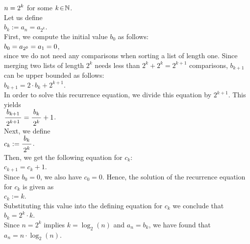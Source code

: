 \hspace*{1.3cm}
$\displaystyle n = 2^k$ \qquad for some $k \!\in\! \mathbb{N}$.
\\[0.2cm]
Let us define
\\[0.2cm]
\hspace*{1.3cm}
$b_k := a_n = a_{2^k}$.
\\[0.2cm]
First, we compute the initial value $b_0$ as follows:
\\[0.2cm]
\hspace*{1.3cm}
$\displaystyle b_0 = a_{2^0} = a_1 = 0$,
\\[0.2cm]
since we do not need any comparisons when sorting a list of length one.  Since merging two lists of
length $2^k$ needs less than  $2^k + 2^k = 2^{k+1}$ comparisons, $b_{k+1}$ can be upper bounded as follows:
\\[0.2cm]
\hspace*{1.3cm}
$b_{k+1} = 2 \cdot b_k + 2^{k+1}$. 
\\[0.2cm]
In order to solve this recurrence equation, we divide this equation by $2^{k+1}$.
This yields
\\[0.2cm]
\hspace*{1.3cm}
$\bruch{b_{k+1}}{2^{k+1}} = \bruch{b_k}{2^k} + 1$.
\\[0.2cm]
Next, we define
\\[0.2cm]
\hspace*{1.3cm}
$c_k := \bruch{b_k}{2^k}$.
\\[0.2cm]
Then, we get the following equation for $c_k$:
\\[0.2cm]
\hspace*{1.3cm}
$c_{k+1} = c_k + 1$.
\\[0.2cm]
Since $b_0 = 0$, we also have $c_0 = 0$.  Hence, the solution of the recurrence equation for $c_k$
is given as
\\[0.2cm]
\hspace*{1.3cm}
$c_k := k$.
\\[0.2cm]
Substituting this value into the defining equation for $c_k$ we conclude that
\\[0.2cm]
\hspace*{1.3cm}
$b_k = 2^k \cdot k$.
\\[0.2cm]
Since $n = 2^k$ implies $k = \log_2(n)$ and $a_n = b_k$, we have found that
\\[0.2cm]
\hspace*{1.3cm}
$a_n = n \cdot \log_2(n)$. 


